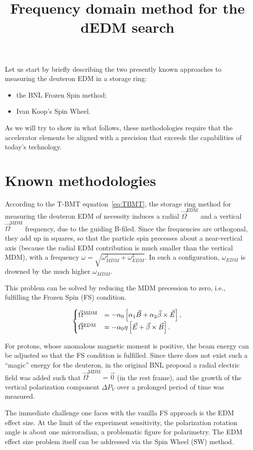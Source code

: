 \documentclass{article}
\newcommand{\W}{\Omega}
\newcommand{\w}{\omega}
\newcommand{\MDM}{^\mathrm{MDM}}
\newcommand{\EDM}{^\mathrm{EDM}}
\begin{document}
\title{Frequency domain method for the dEDM search}
Let us start by briefly describing the two presently known approaches to measuring the deuteron EDM in a storage ring:
\begin{itemize}
\item the BNL Frozen Spin method;
\item Ivan Koop's Spin Wheel.
\end{itemize}

As we will try to show in what follows, these methodologies require that the accelerator elements be aligned with a precision that exceeds the capabilities of today's technology.

\section{Known methodologies}
According to the T-BMT equation~\eqref{eq:TBMT}, the storage ring method for measuring the deuteron EDM of necessity induces a radial $\vec\W\EDM$ and a vertical $\vec\W\MDM$ frequency, due to the guiding B-filed. Since the frequencies are orthogonal, they add up in squares, so that the particle spin precesses about a near-vertical axis (because the radial EDM contribution is much smaller than the vertical MDM), with a frequency $\w  = \sqrt{\w_{MDM}^2 + \w_{EDM}^2}$. In such a configuration, $\w_{EDM}$ is drowned by the much higher $\w_{MDM}$.

This problem can be solved by reducing the MDM precession to zero, i.e., fulfilling the Frozen Spin (FS) condition.

\begin{equation}\label{eq:TBMT}
  \begin{cases}
    \vec\W\MDM &= -\alpha_0\bkt*{\alpha_1\vec B + \alpha_2\vec\beta\times\vec E}, \\
    \vec\W\EDM &= -\alpha_0\eta\bkt*{\vec E + \vec\beta\times\vec B}.
  \end{cases}
\end{equation}

For protons, whose anomalous magnetic moment is positive, the beam energy can be adjusted so that the FS condition is fulfilled. Since there does not exist such a ``magic'' energy for the deuteron, in the original BNL proposal a radial electric field was added such that $\vec\W\MDM = \vec 0$ (in the rest frame), and the growth of the vertical polarization component $\Delta P_V$ over a prolonged period of time was measured.~\cite{BNL_proposal}

The immediate challenge one faces with the vanilla FS approach is the EDM effect size. At the limit of the experiment sensitivity, the polarization rotation angle is about one microradian, a problematic figure for polarimetry. The EDM effect size problem itself can be addressed via the Spin Wheel (SW) method.~\cite{Mane:SpinWheel}
\end{document}
